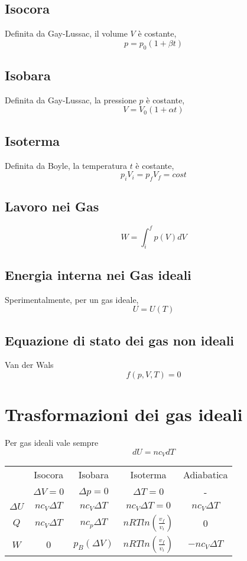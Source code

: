\documentclass[a4paper]{report}
\begin{document}
  \subsection{Isocora}
  Definita da Gay-Lussac, il volume $V$ è costante,
  \[ p = p_0(1 + \beta t) \]
  \subsection{Isobara}
  Definita da Gay-Lussac, la pressione $p$ è costante,
  \[ V = V_0(1 + \alpha t) \]
  \subsection{Isoterma}
  Definita da Boyle, la temperatura $t$ è costante,
  \[ p_i V_i = p_f V_f = cost\]
  \subsection{Lavoro nei Gas}
  \[ W = \int_i^f p(V)dV \]
  \subsection{Energia interna nei Gas ideali}
  Sperimentalmente, per  un gas ideale,
  \[ U = U(T) \]
  \subsection{Equazione di stato dei gas non ideali}
  Van der Wals
  \[ f(p,V,T) = 0 \]

  \section{Trasformazioni dei gas ideali}
  Per gas ideali vale sempre
  \[ dU = n c_V dT \]
  \begin{center}
  \begin{tabular}{ |c|c|c|c|c| }
   \hline
    & Isocora & Isobara & Isoterma & Adiabatica \\
    & $\Delta V = 0$ & $\Delta p = 0$ & $\Delta T = 0$ & -\\
   \hline
   $\Delta U$ & $n c_V \Delta T$ & $n c_V \Delta T$ & $n c_V \Delta T = 0$ & $n c_V \Delta T$ \\
   $Q$ & $n c_V \Delta T$ & $n c_p \Delta T$ & $nR T ln(\frac{v_f}{v_i})$ & $0$\\
   $W$ & $0$ & $p_B(\Delta V)$ & $nR T ln(\frac{v_f}{v_i})$ & $-n c_V \Delta T$ \\
   \hline
  \end{tabular}
  \end{center}
\end{document}
